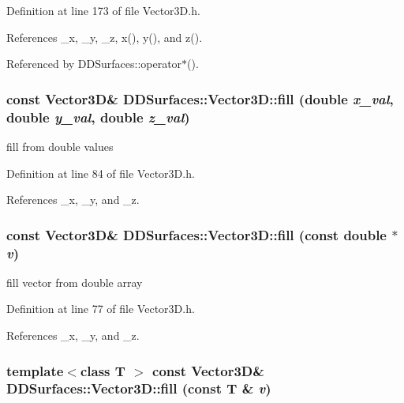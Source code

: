 Definition at line 173 of file Vector3D.h.

References \_\-x, \_\-y, \_\-z, x(), y(), and z().

Referenced by DDSurfaces::operator$\ast$().\hypertarget{class_d_d_surfaces_1_1_vector3_d_a6576119c90b9e05b6046506de6b1f87e}{
\subsubsection[{fill}]{\setlength{\rightskip}{0pt plus 5cm}const {\bf Vector3D}\& DDSurfaces::Vector3D::fill (double {\em x\_\-val}, \/  double {\em y\_\-val}, \/  double {\em z\_\-val})}}
\label{class_d_d_surfaces_1_1_vector3_d_a6576119c90b9e05b6046506de6b1f87e}


fill from double values 

Definition at line 84 of file Vector3D.h.

References \_\-x, \_\-y, and \_\-z.\hypertarget{class_d_d_surfaces_1_1_vector3_d_a885f3dc7b3cfb7aea34c282b2ab01401}{
\subsubsection[{fill}]{\setlength{\rightskip}{0pt plus 5cm}const {\bf Vector3D}\& DDSurfaces::Vector3D::fill (const double $\ast$ {\em v})}}
\label{class_d_d_surfaces_1_1_vector3_d_a885f3dc7b3cfb7aea34c282b2ab01401}


fill vector from double array 

Definition at line 77 of file Vector3D.h.

References \_\-x, \_\-y, and \_\-z.\hypertarget{class_d_d_surfaces_1_1_vector3_d_aca1a3d8cf1991c79d55c1c8b0c4cb436}{
\subsubsection[{fill}]{\setlength{\rightskip}{0pt plus 5cm}template$<$class T $>$ const {\bf Vector3D}\& DDSurfaces::Vector3D::fill (const {\bf T} \& {\em v})}}
\label{class_d_d_surfaces_1_1_vector3_d_aca1a3d8cf1991c79d55c1c8b0c4cb436}


